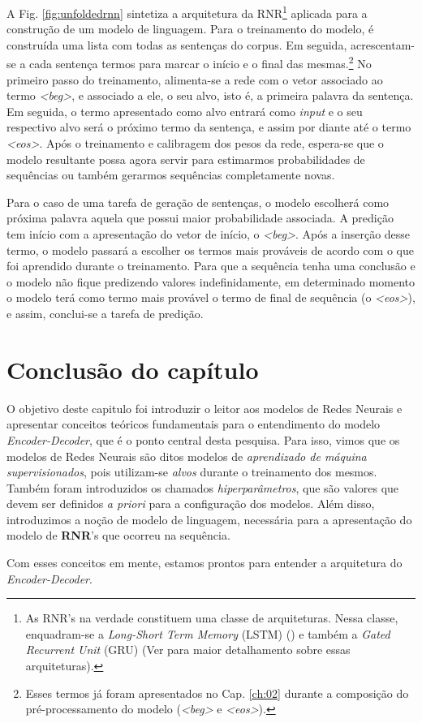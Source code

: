 A Fig. \ref{fig:unfoldedrnn} sintetiza a arquitetura da RNR\footnote{As RNR's na verdade constituem uma classe de arquiteturas. Nessa classe, enquadram-se a \textit{Long-Short Term Memory} (LSTM) (\cite{hochreiter:1997}) e também a \textit{Gated Recurrent Unit} (GRU) (Ver \cite{josh:2017} para maior detalhamento sobre essas arquiteturas).} aplicada para a construção de um modelo de linguagem. Para o treinamento do modelo, é construída uma lista com todas as sentenças do corpus. Em seguida, acrescentam-se a cada sentença termos para marcar o início e o final das mesmas.\footnote{Esses termos já foram apresentados no Cap. \ref{ch:02} durante a composição do pré-processamento do modelo (\textit{<beg>} e \textit{<eos>}).} No primeiro passo do treinamento, alimenta-se a rede com o vetor associado ao termo \textit{<beg>}, e associado a ele, o seu alvo, isto é, a primeira palavra da sentença. Em seguida, o termo apresentado como alvo entrará como \textit{input} e o seu respectivo alvo será o próximo termo da sentença, e assim por diante até o termo \textit{<eos>}. Após o treinamento e calibragem dos pesos da rede, espera-se que o modelo resultante possa agora servir para estimarmos probabilidades de sequências ou também gerarmos sequências completamente novas.

Para o caso de uma tarefa de geração de sentenças, o modelo escolherá como próxima palavra aquela que possui maior probabilidade associada. 
A predição tem início com a apresentação do vetor de início, o \textit{<beg>}. Após a inserção desse termo, o modelo passará a escolher os termos mais prováveis de acordo com o que foi aprendido durante o treinamento. Para que a sequência tenha uma conclusão e o modelo não fique predizendo valores indefinidamente, em determinado momento o modelo terá como termo mais provável o termo de final de sequência (o \textit{<eos>}), e assim, conclui-se a tarefa de predição.  



\section{Conclusão do capítulo}

O objetivo deste capitulo foi introduzir o leitor aos modelos de Redes Neurais e apresentar conceitos teóricos fundamentais para o entendimento do modelo \textit{Encoder-Decoder}, que é o ponto central desta pesquisa. Para isso, vimos que os modelos de Redes Neurais são ditos modelos de \textit{aprendizado de máquina supervisionados}, pois utilizam-se \textit{alvos} durante o treinamento dos mesmos. Também foram introduzidos os chamados \textit{hiperparâmetros}, que são valores que devem ser definidos \textit{a priori} para a configuração dos modelos. Além disso, introduzimos a noção de modelo de linguagem, necessária para a apresentação do modelo de \textbf{RNR}'s que ocorreu na sequência. 

Com esses conceitos em mente, estamos prontos para entender a arquitetura do \textit{Encoder-Decoder}.

